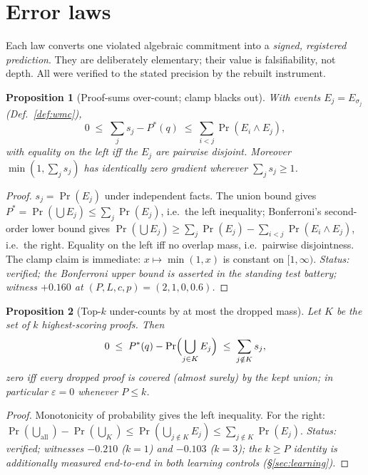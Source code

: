 \documentclass[10pt]{article}
\newtheorem{proposition}{Proposition}
\theoremstyle{remark}
\newcommand{\eps}{\varepsilon}
\begin{document}
\section{Error laws}\label{sec:laws}

Each law converts one violated algebraic commitment into a \emph{signed, registered prediction}.
They are deliberately elementary; their value is falsifiability, not depth. All were verified to
the stated precision by the rebuilt instrument.

\begin{proposition}[Proof-sums over-count; clamp blacks out]\label{prop:addmult}
With events $E_j = E_{\sigma_j}$ (Def.~\ref{def:wmc}),
\[
0 \;\le\; \sum_{j} s_j - P^*(q) \;\le\; \sum_{i<j} \Pr(E_i \wedge E_j),
\]
with equality on the left iff the $E_j$ are pairwise disjoint. Moreover
$\min(1,\sum_j s_j)$ has identically zero gradient wherever $\sum_j s_j \ge 1$.
\end{proposition}
\begin{proof}
$s_j = \Pr(E_j)$ under independent facts. The union bound gives $P^* = \Pr(\bigcup E_j) \le \sum_j
\Pr(E_j)$, i.e.\ the left inequality; Bonferroni's second-order lower bound gives $\Pr(\bigcup
E_j) \ge \sum_j \Pr(E_j) - \sum_{i<j}\Pr(E_i\wedge E_j)$, i.e.\ the right. Equality on the left
iff no overlap mass, i.e.\ pairwise disjointness. The clamp claim is immediate: $x \mapsto
\min(1,x)$ is constant on $[1,\infty)$. \emph{Status: verified; the Bonferroni upper bound is
asserted in the standing test battery; witness $+0.160$ at $(P,L,c,p)=(2,1,0,0.6)$.}
\end{proof}

\begin{proposition}[Top-$k$ under-counts by at most the dropped mass]\label{prop:topk}
Let $K$ be the set of $k$ highest-scoring proofs. Then
\[
0 \;\le\; P^*(q) - \Pr\Bigl(\bigcup_{j \in K} E_j\Bigr) \;\le\; \sum_{j \notin K} s_j ,
\]
zero iff every dropped proof is covered (almost surely) by the kept union; in particular
$\eps = 0$ whenever $P \le k$.
\end{proposition}
\begin{proof}
Monotonicity of probability gives the left inequality. For the right:
$\Pr(\bigcup_{\text{all}}) - \Pr(\bigcup_K) \le \Pr(\bigcup_{j\notin K} E_j) \le \sum_{j\notin K}
\Pr(E_j)$. \emph{Status: verified; witnesses $-0.210$ ($k{=}1$) and $-0.103$ ($k{=}3$); the
$k \ge P$ identity is additionally measured end-to-end in both learning controls
(\S\ref{sec:learning}).}
\end{proof}
\end{document}
